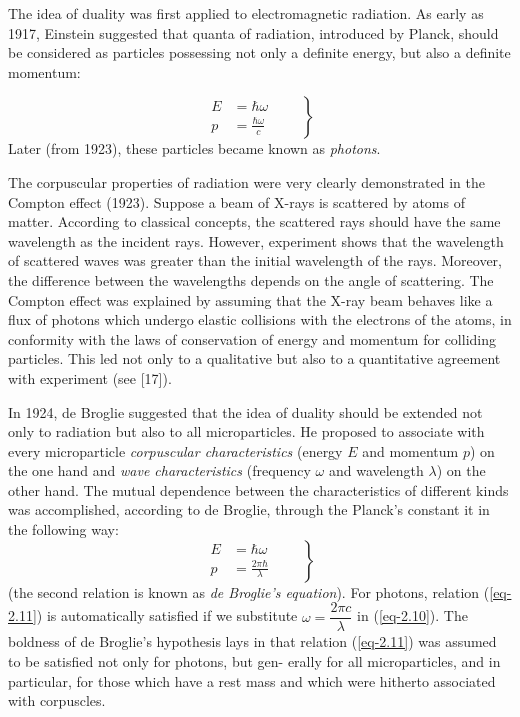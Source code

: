 \documentclass[a4paper,sfsidenotes,colorlinks=true]{tufte-book}
\numberwithin{equation}{section}
\numberwithin{figure}{section}
\begin{document}
The idea of duality was first applied to electromagnetic radiation. As
early as 1917, Einstein suggested that quanta of radiation, introduced
by Planck, should be considered as particles possessing not only a
definite energy, but also a definite momentum: 
\addtocounter{equation}{1}
\begin{equation}%
\left.
\begin{split}
E & = \hbar \omega\\
p & = \frac{\hbar \omega}{c}
\end{split}
\quad \quad \right\}
\label{eq-2.10} 
\end{equation}
Later (from 1923), these particles became known as \emph{photons}.  

\begin{fullwidth}
  \setlength{\leftskip}{3cm} \textsf{\small The corpuscular properties of radiation were very clearly demonstrated
in the Compton effect (1923). Suppose a beam of X-rays is scattered by
atoms of matter. According to classical concepts, the scattered rays
should have the same wavelength as the incident rays. However,
experiment shows that the wavelength of scattered waves was greater
than the initial wavelength of the rays. Moreover, the difference
between the wavelengths depends on the angle of scattering. The
Compton effect was explained by assuming that the X-ray beam behaves
like a flux of photons which undergo elastic collisions with the
electrons of the atoms, in conformity with the laws of conservation of
energy and momentum for colliding particles. This led not only to a
qualitative but also to a quantitative agreement with experiment
(see [17]).}
\end{fullwidth}
\vspace{5pt}
\setlength{\leftskip}{0pt}


In 1924, de Broglie suggested that the idea of duality should be
extended not only to radiation but also to all microparticles. He
proposed to associate with every microparticle \emph{corpuscular
  characteristics} (energy $E$ and momentum $p$) on the one hand and
\emph{wave characteristics} (frequency $\omega$ and wavelength
$\lambda$) on the other hand. The mutual dependence between the
characteristics of different kinds was accomplished, according to de
Broglie, through the Planck's constant it in the following way:
\begin{equation}%
\left.
\begin{split}
E & = \hbar \omega\\
p & = \frac{ 2 \pi \hbar}{\lambda}
\end{split}
\quad \quad \right\}
\label{eq-2.11} 
\end{equation}
(the second relation is known as \emph{de Broglie's equation}). For
photons, relation (\ref{eq-2.11}) is automatically satisfied if we
substitute $\omega = \dfrac{2 \pi c}{\lambda}$ in (\ref{eq-2.10}). The
boldness of de Broglie's hypothesis lays in that relation
(\ref{eq-2.11}) was assumed to be satisfied not only for photons, but
gen- erally for all microparticles, and in particular, for those which
have a rest mass and which were hitherto associated with corpuscles.
\end{document}
